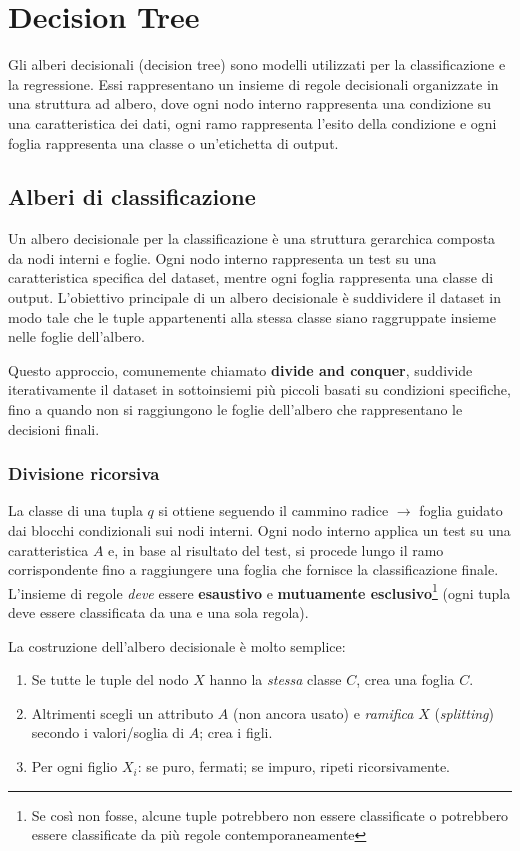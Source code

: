 \chapter{Decision Tree}
Gli alberi decisionali (decision tree) sono modelli utilizzati per la classificazione e la regressione. Essi rappresentano un insieme di regole decisionali organizzate in una struttura ad albero, dove ogni nodo interno rappresenta una condizione su una caratteristica dei dati, ogni ramo rappresenta l'esito della condizione e ogni foglia rappresenta una classe o un'etichetta di output.

\section{Alberi di classificazione}
Un albero decisionale per la classificazione è una struttura gerarchica composta da nodi interni e foglie. Ogni nodo interno rappresenta un test su una caratteristica specifica del dataset, mentre ogni foglia rappresenta una classe di output. L'obiettivo principale di un albero decisionale è suddividere il dataset in modo tale che le tuple appartenenti alla stessa classe siano raggruppate insieme nelle foglie dell'albero.

Questo approccio, comunemente chiamato \textbf{divide and conquer}, suddivide iterativamente il dataset in sottoinsiemi più piccoli basati su condizioni specifiche, fino a quando non si raggiungono le foglie dell'albero che rappresentano le decisioni finali.

\subsection{Divisione ricorsiva}
La classe di una tupla $q$ si ottiene seguendo il cammino radice $\rightarrow$ foglia guidato dai blocchi condizionali sui nodi interni. Ogni nodo interno applica un test su una caratteristica $A$ e, in base al risultato del test, si procede lungo il ramo corrispondente fino a raggiungere una foglia che fornisce la classificazione finale. L'insieme di regole \emph{deve} essere \textbf{esaustivo} e \textbf{mutuamente esclusivo}\footnote{Se così non fosse, alcune tuple potrebbero non essere classificate o potrebbero essere classificate da più regole contemporaneamente} (ogni tupla deve essere classificata da una e una sola regola).

La costruzione dell'albero decisionale è molto semplice:
\begin{enumerate}
  \item Se tutte le tuple del nodo $X$ hanno la \emph{stessa} classe $C$, crea una foglia $C$.
  \item Altrimenti scegli un attributo $A$ (non ancora usato) e \emph{ramifica} $X$ (\emph{splitting}) secondo i valori/soglia di $A$; crea i figli.
  \item Per ogni figlio $X_i$: se puro, fermati; se impuro, ripeti ricorsivamente.
\end{enumerate}

